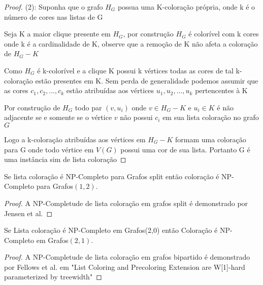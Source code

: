\begin{proof}
      (2):\newline
      Suponha que o grafo $H_G$ possua uma K-coloração própria, onde k é o número de cores nas listas de G
      
      Seja K a maior clique presente em $H_G$, por construção $H_G$ é colorível com k cores onde k é a cardinalidade de K, observe que a remoção de K não afeta a coloração de $H_G - K$
      
      Como $H_G$ é k-colorível e a clique K possui k vértices todas as cores de tal k-coloração estão presentes em K. Sem perda de generalidade podemos assumir que as cores $c_1,c_2,...,c_k$ estão atribuídas aos vértices $u_1,u_2,...,u_k$ pertencentes à K
      
      Por construção de $H_G$ todo par $(v,u_i)$ onde $v \in H_G - K$ e $u_i \in K$ é não adjacente se e somente se o vértice $v$ não possui $c_i$ em sua lista coloração no grafo $G$
      
      Logo a k-coloração atribuídas aos vértices em $H_G - K$ formam uma coloração para G onde todo vértice em $V(G)$ possui uma cor de sua lista. Portanto G é uma instância sim de lista coloração
    \end{proof}
    \begin{corolario}
     Se lista coloração é NP-Completo para Grafos split então coloração é NP-Completo para Grafos$(1,2)$.
     \begin{proof}
     A NP-Completude de lista coloração em grafos split é demonstrado por Jensen et al.\cite{jansen1997}
     \end{proof}
    \end{corolario}
    \begin{corolario}
    Se Lista coloração é NP-Completo em Grafos(2,0) então Coloração é NP-Completo em Grafos$(2,1)$.
    \begin{proof}
    A NP-Completude de lista coloração em grafos bipartido é demonstrado por Fellows et al. em "List Coloring and Precoloring Extension are W[1]-hard parameterized by treewidth"
    \end{proof}
    \end{corolario}    
